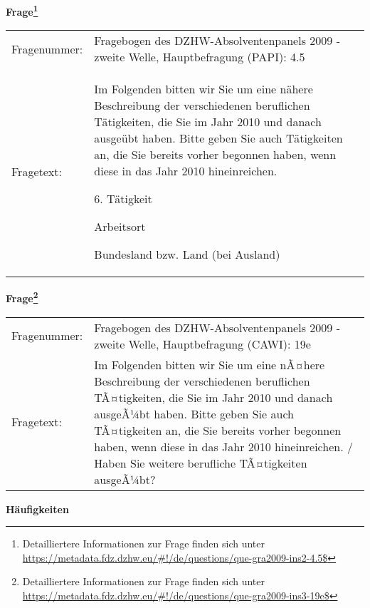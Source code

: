 				\vspace*{0.5cm}
                \noindent\textbf{Frage\footnote{Detailliertere Informationen zur Frage finden sich unter
		              \url{https://metadata.fdz.dzhw.eu/\#!/de/questions/que-gra2009-ins2-4.5$}}}\\
				\begin{tabularx}{\hsize}{@{}lX}
					Fragenummer: &
					  Fragebogen des DZHW-Absolventenpanels 2009 - zweite Welle, Hauptbefragung (PAPI):
					  4.5
 \\
					Fragetext: & Im Folgenden bitten wir Sie um eine nähere Beschreibung der verschiedenen beruflichen Tätigkeiten, die Sie im Jahr 2010 und danach ausgeübt haben. Bitte geben Sie auch Tätigkeiten an, die Sie bereits vorher begonnen haben, wenn diese in das Jahr 2010 hineinreichen.\par  6. Tätigkeit\par  Arbeitsort\par  Bundesland bzw. Land (bei Ausland) \\
				\end{tabularx}
				\vspace*{0.5cm}
                \noindent\textbf{Frage\footnote{Detailliertere Informationen zur Frage finden sich unter
		              \url{https://metadata.fdz.dzhw.eu/\#!/de/questions/que-gra2009-ins3-19e$}}}\\
				\begin{tabularx}{\hsize}{@{}lX}
					Fragenummer: &
					  Fragebogen des DZHW-Absolventenpanels 2009 - zweite Welle, Hauptbefragung (CAWI):
					  19e
 \\
					Fragetext: & Im Folgenden bitten wir Sie um eine nÃ¤here Beschreibung der verschiedenen beruflichen TÃ¤tigkeiten, die Sie im Jahr 2010 und danach ausgeÃ¼bt haben. Bitte geben Sie auch TÃ¤tigkeiten an, die Sie bereits vorher begonnen haben, wenn diese in das Jahr 2010 hineinreichen. / Haben Sie weitere berufliche TÃ¤tigkeiten ausgeÃ¼bt? \\
				\end{tabularx}





        		\vspace*{0.5cm}
                \noindent\textbf{Häufigkeiten}

